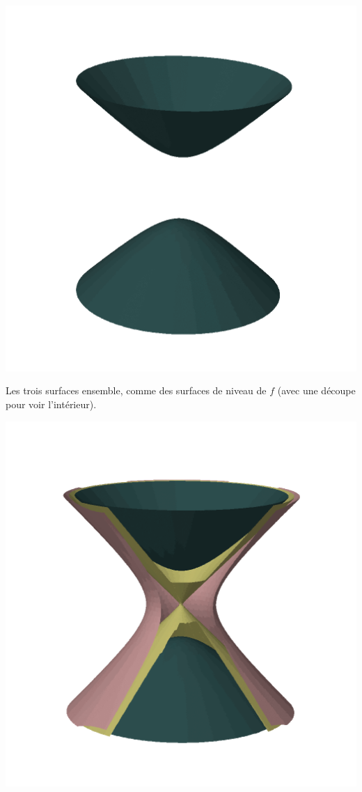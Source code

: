 \documentclass[11pt, class=report,crop=false]{standalone}
\begin{document}
\begin{exemple}
\begin{center}
  \includegraphics[scale=0.25]{figures/fig-gradient-06b}
\end{center}
Les trois surfaces ensemble, comme des surfaces de niveau de $f$ (avec une découpe pour voir l'intérieur). 
\begin{center}  
  \includegraphics[scale=0.4]{figures/fig-gradient-06a}   
\end{center}
  
\end{exemple}
\end{document}
